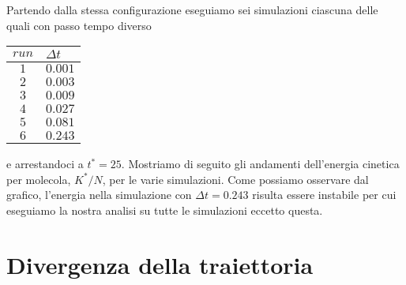 \documentclass[a4paper,11pt]{article}
\begin{document}
\noindent Partendo dalla stessa configurazione eseguiamo sei simulazioni  ciascuna delle quali con passo tempo diverso
\begin{table}[H]
	\centering
	\begin{tabular}{cl} 
		\hline
		$run$	&	$\Delta t$ \\
		\hline
		$1$	&	$0.001$\\
		$2$	&	$0.003$	\\
		$3$	&	$0.009$	\\
		$4$	&	$0.027$	\\
		$5$	&	$0.081$	\\
		$6$	&	$0.243$	\\\hline
	\end{tabular}
\end{table}
\medskip
\noindent e arrestandoci a $t^* = 25$. Mostriamo di seguito gli andamenti dell'energia cinetica per molecola, $K^*/N$, per le varie simulazioni.
Come possiamo osservare dal grafico, l'energia nella simulazione con $\Delta t = 0.243$ risulta essere instabile per cui eseguiamo la nostra analisi su tutte le simulazioni eccetto questa.

\section*{Divergenza della traiettoria}











 
\end{document}
